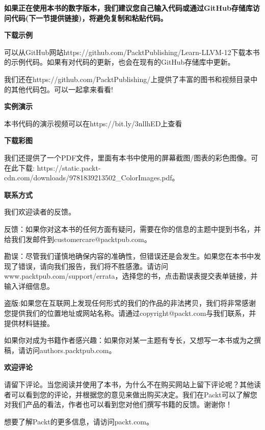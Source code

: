 \textbf{如果正在使用本书的数字版本，我们建议您自己输入代码或通过GitHub存储库访问代码(下一节提供链接)，将避免复制和粘贴代码。}\par

\hspace*{\fill} \par %
\textbf{下载示例}

可以从GitHub网站https://github.com/PacktPublishing/Learn-LLVM-12下载本书的示例代码。如果有对代码的更新，也会在现有的GitHub存储库中更新。\par

我们还在https://github.com/PacktPublishing/上提供了丰富的图书和视频目录中的其他代码包。可以一起拿来看看!\par

\hspace*{\fill} \par %
\textbf{实例演示}

本书代码的演示视频可以在https://bit.ly/3nllhED上查看 \par

\hspace*{\fill} \par %
\textbf{下载彩图}

我们还提供了一个PDF文件，里面有本书中使用的屏幕截图/图表的彩色图像。可在此下载:
https://static.packt-cdn.com/downloads/9781839213502\_ColorImages.pdf。\par

\hspace*{\fill} \par %
\textbf{联系方式}

我们欢迎读者的反馈。\par

反馈：如果你对这本书的任何方面有疑问，需要在你的信息的主题中提到书名，并给我们发邮件到customercare@packtpub.com。\par

勘误：尽管我们谨慎地确保内容的准确性，但错误还是会发生。如果您在本书中发现了错误，请向我们报告，我们将不胜感激。请访问www.packtpub.com/support/errata，选择您的书，点击勘误表提交表单链接，并输入详细信息。\par

盗版:如果您在互联网上发现任何形式的我们的作品的非法拷贝，我们将非常感谢您提供我们的位置地址或网站名称。请通过copyright@packt.com与我们联系，并提供材料链接。\par

如果你对成为书籍作者感兴趣：如果你对某一主题有专长，又想写一本书或为之撰稿，请访问authors.packtpub.com。\par

\hspace*{\fill} \par %
\textbf{欢迎评论}

请留下评论。当您阅读并使用了本书，为什么不在购买网站上留下评论呢？其他读者可以看到您的评论，并根据您的意见来做出购买决定。我们在Packt可以了解您对我们产品的看法，作者也可以看到您对他们撰写书籍的反馈。谢谢你！\par

想要了解Packt的更多信息，请访问packt.com。\par

\newpage

















